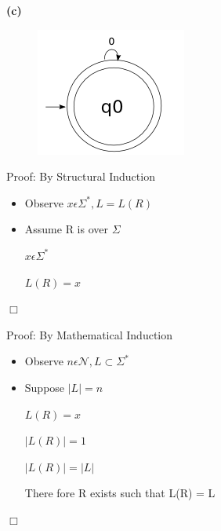 \documentclass[11pt]{article}
\newcommand{\question}[2] {\vspace{.25in} \fbox{#1} #2 \vspace{.10in}}
\renewcommand{\part}[1] {\vspace{.10in} {\bf (#1)}}
\begin{document}
 \part{c}
  \begin{figure}[h!]
    \begin{center}
      \includegraphics[scale=0.40]{19c.png}
    \end{center}
  \end{figure}


\question{5}{Proof: By Structural Induction}
\begin{center}
  \begin{itemize}
    \item Observe $x \epsilon {\Sigma}^{*}, L = L(R)$
    \item Assume R is over $\Sigma$

    $ x \epsilon {\Sigma}^{*} $ 

    $ L(R) = {x} $ 


  \end{itemize}
\end{center}

\indent $\Box$

\question{6}{Proof: By Mathematical Induction}
\begin{center}
  \begin{itemize}

    \item Observe $n \epsilon \mathcal{N}, L \subset {\Sigma}^{*}$

    \item Suppose $|L| = n $

    $ L(R) = {x} $

    $ |L(R)| = 1 $

    $ |L(R)| = |L| $

    There fore R exists such that L(R) = L

  \end{itemize}
\end{center}

\indent $\Box$
\end{document}
